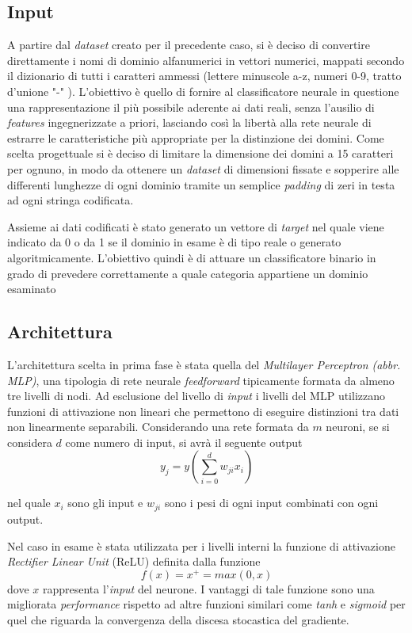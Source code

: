 \subsection{Input}
\label{classificatorenninput}
A partire dal \textit{dataset} creato per il precedente caso, si è deciso di convertire direttamente i nomi di dominio alfanumerici in vettori numerici, mappati secondo il dizionario di tutti i caratteri ammessi \cite{icann} (lettere minuscole a-z, numeri 0-9, tratto d'unione "-" ). L'obiettivo è quello di fornire al classificatore neurale in questione una rappresentazione il più possibile aderente ai dati reali, senza l'ausilio di \textit{features} ingegnerizzate a priori, lasciando così la libertà alla rete neurale di estrarre le caratteristiche più appropriate per la distinzione dei domini. Come scelta progettuale si è deciso di limitare la dimensione dei domini a 15 caratteri per ognuno, in modo da ottenere un \textit{dataset} di dimensioni fissate e sopperire alle differenti lunghezze di ogni dominio tramite un semplice \textit{padding} di zeri in testa ad ogni stringa codificata.

Assieme ai dati codificati è stato generato un vettore di \textit{target} nel quale viene indicato da 0 o da 1 se il dominio in esame è di tipo reale o generato algoritmicamente. L'obiettivo quindi è di attuare un classificatore binario in grado di prevedere correttamente a quale categoria appartiene un dominio esaminato 

\subsection{Architettura}
\label{classificatorenninterno}
L'architettura scelta in prima fase è stata quella del \textit{Multilayer Perceptron} \textit{(abbr. MLP)}, una tipologia di rete neurale \textit{feedforward} tipicamente formata da almeno tre livelli di nodi. Ad esclusione del livello di \textit{input} i livelli del MLP utilizzano  funzioni di attivazione non lineari che permettono di eseguire distinzioni tra dati non linearmente separabili. Considerando una rete formata da $m$ neuroni,  se si considera $d$ come numero di input, si avrà il seguente output
$$y_j=y\left( \sum_{i=0}^d w_{ji}x_i \right)$$

nel quale $x_i$ sono gli input e $w_{ji}$ sono i pesi di ogni input combinati con ogni output. 


Nel caso in esame è stata utilizzata per i livelli interni la funzione di attivazione \textit{Rectifier Linear Unit} (ReLU) \cite{relu} definita dalla funzione 
$$f(x) = x^+ = max(0,x)$$
dove $x$ rappresenta l'\textit{input} del neurone. 
I vantaggi di tale funzione sono una migliorata \textit{performance} rispetto ad altre funzioni similari come \textit{tanh} e \textit{sigmoid} per quel che riguarda la convergenza della discesa stocastica del gradiente. 

